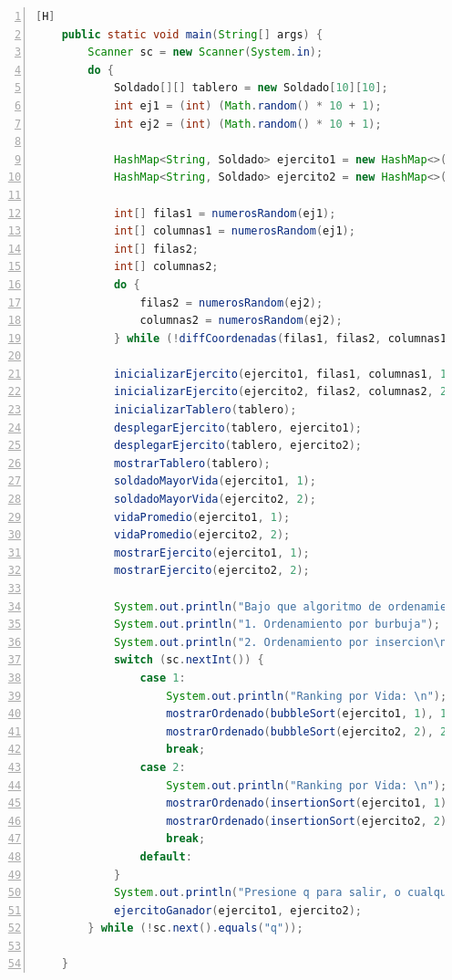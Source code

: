\documentclass{article}
\begin{document}
	\begin{lstlisting}[language=java,caption={Método main final}, numbers=left][H]
	public static void main(String[] args) {
        Scanner sc = new Scanner(System.in);
        do {
            Soldado[][] tablero = new Soldado[10][10];
            int ej1 = (int) (Math.random() * 10 + 1);
            int ej2 = (int) (Math.random() * 10 + 1);

            HashMap<String, Soldado> ejercito1 = new HashMap<>();
            HashMap<String, Soldado> ejercito2 = new HashMap<>();

            int[] filas1 = numerosRandom(ej1);
            int[] columnas1 = numerosRandom(ej1);
            int[] filas2;
            int[] columnas2;
            do {
                filas2 = numerosRandom(ej2);
                columnas2 = numerosRandom(ej2);
            } while (!diffCoordenadas(filas1, filas2, columnas1, columnas2));

            inicializarEjercito(ejercito1, filas1, columnas1, 1);
            inicializarEjercito(ejercito2, filas2, columnas2, 2);
            inicializarTablero(tablero);
            desplegarEjercito(tablero, ejercito1);
            desplegarEjercito(tablero, ejercito2);
            mostrarTablero(tablero);
            soldadoMayorVida(ejercito1, 1);
            soldadoMayorVida(ejercito2, 2);
            vidaPromedio(ejercito1, 1);
            vidaPromedio(ejercito2, 2);
            mostrarEjercito(ejercito1, 1);
            mostrarEjercito(ejercito2, 2);

            System.out.println("Bajo que algoritmo de ordenamiento le gustaria ordenar su ejercito?");
            System.out.println("1. Ordenamiento por burbuja");
            System.out.println("2. Ordenamiento por insercion\n");
            switch (sc.nextInt()) {
                case 1:
                    System.out.println("Ranking por Vida: \n");
                    mostrarOrdenado(bubbleSort(ejercito1, 1), 1);
                    mostrarOrdenado(bubbleSort(ejercito2, 2), 2);
                    break;
                case 2:
                    System.out.println("Ranking por Vida: \n");
                    mostrarOrdenado(insertionSort(ejercito1, 1), 1);
                    mostrarOrdenado(insertionSort(ejercito2, 2), 2);
                    break;
                default:
            }
            System.out.println("Presione q para salir, o cualquier otra tecla para volver a jugar");
            ejercitoGanador(ejercito1, ejercito2);
        } while (!sc.next().equals("q"));

    }
	\end{lstlisting}
	
\end{document}
